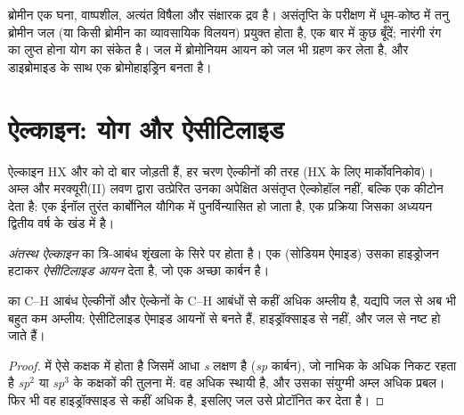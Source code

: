 \begin{inthelab}[ब्रोमीन जल]
ब्रोमीन एक घना, वाष्पशील, अत्यंत विषैला और संक्षारक द्रव है। असंतृप्ति के
परीक्षण में धूम-कोष्ठ में तनु ब्रोमीन जल (या किसी ब्रोमीन  का
व्यावसायिक विलयन) प्रयुक्त होता है, एक बार में कुछ बूँदें; नारंगी रंग का
लुप्त होना योग का संकेत है। जल में ब्रोमोनियम आयन को
जल भी ग्रहण कर लेता है, और डाइब्रोमाइड के साथ एक ब्रोमोहाइड्रिन बनता है।
\end{inthelab}

\section{ऐल्काइन: योग और ऐसीटिलाइड}

ऐल्काइन HX और  को दो बार जोड़ती हैं, हर चरण ऐल्कीनों की तरह (HX के लिए
मार्कोवनिकोव)। अम्ल और मरक्यूरी(II) लवण द्वारा उत्प्रेरित उनका 
अपेक्षित असंतृप्त ऐल्कोहॉल नहीं, बल्कि एक कीटोन देता है: एक ईनॉल
तुरंत कार्बोनिल यौगिक में पुनर्विन्यासित हो जाता है, एक प्रक्रिया जिसका अध्ययन द्वितीय वर्ष के खंड में है।

\begin{definition}[अंतस्थ ऐल्काइन, ऐसीटिलाइड]\label{def:b1:electrophilic-additions:acetylide}
\emph{अंतस्थ ऐल्काइन}  का
त्रि-आबंध शृंखला के सिरे पर होता है। एक  (सोडियम ऐमाइड)
उसका हाइड्रोजन हटाकर \emph{ऐसीटिलाइड आयन}
 देता है, जो एक अच्छा कार्बन  है।
\end{definition}

\begin{proposition}[अंतस्थ ऐल्काइनों की अम्लता]\label{prop:b1:electrophilic-additions:acetylide-acidity}
 का C--H आबंध ऐल्कीनों और ऐल्केनों के C--H आबंधों से कहीं अधिक
अम्लीय है, यद्यपि जल से अब भी बहुत कम अम्लीय: ऐसीटिलाइड
ऐमाइड आयनों से बनते हैं, हाइड्रॉक्साइड से नहीं, और जल से नष्ट हो जाते हैं।
\end{proposition}

\begin{proof}
 में  ऐसे कक्षक में होता है जिसमें आधा
\textit{s} लक्षण है (\textit{sp} कार्बन), जो नाभिक के अधिक निकट रहता है
\textit{sp}$^2$ या \textit{sp}$^3$  के कक्षकों की तुलना में: वह अधिक
स्थायी है, और उसका संयुग्मी अम्ल अधिक प्रबल। फिर भी वह हाइड्रॉक्साइड से
कहीं अधिक  है, इसलिए जल उसे प्रोटॉनित कर देता है।
\end{proof}

